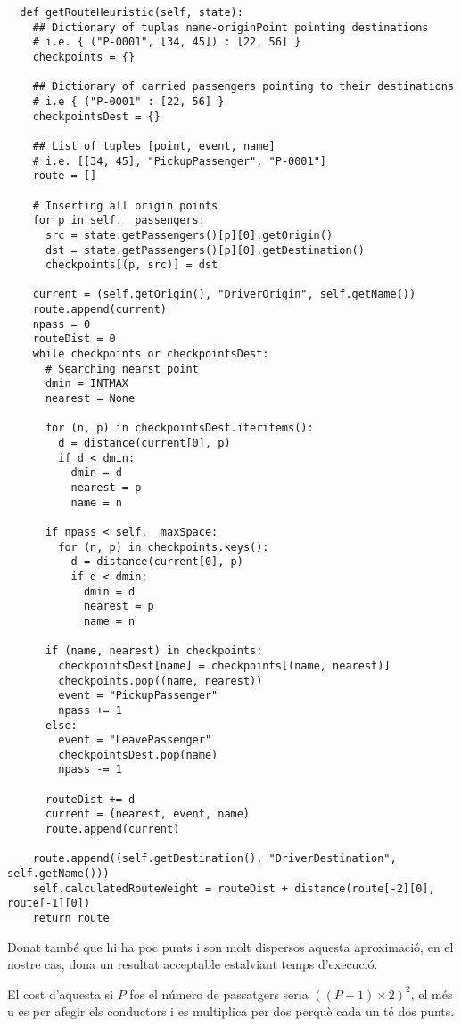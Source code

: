 \begin{verbatim}
  def getRouteHeuristic(self, state):
    ## Dictionary of tuplas name-originPoint pointing destinations
    # i.e. { ("P-0001", [34, 45]) : [22, 56] }
    checkpoints = {}

    ## Dictionary of carried passengers pointing to their destinations
    # i.e { ("P-0001" : [22, 56] }
    checkpointsDest = {}

    ## List of tuples [point, event, name]
    # i.e. [[34, 45], "PickupPassenger", "P-0001"]
    route = []

    # Inserting all origin points
    for p in self.__passengers:
      src = state.getPassengers()[p][0].getOrigin()
      dst = state.getPassengers()[p][0].getDestination()
      checkpoints[(p, src)] = dst

    current = (self.getOrigin(), "DriverOrigin", self.getName())
    route.append(current)
    npass = 0
    routeDist = 0
    while checkpoints or checkpointsDest:
      # Searching nearst point
      dmin = INTMAX
      nearest = None

      for (n, p) in checkpointsDest.iteritems():
        d = distance(current[0], p)
        if d < dmin:
          dmin = d
          nearest = p
          name = n

      if npass < self.__maxSpace:
        for (n, p) in checkpoints.keys():
          d = distance(current[0], p)
          if d < dmin:
            dmin = d
            nearest = p
            name = n

      if (name, nearest) in checkpoints:
        checkpointsDest[name] = checkpoints[(name, nearest)]
        checkpoints.pop((name, nearest))
        event = "PickupPassenger"
        npass += 1
      else:
        event = "LeavePassenger"
        checkpointsDest.pop(name)
        npass -= 1
        
      routeDist += d
      current = (nearest, event, name)
      route.append(current)
    
    route.append((self.getDestination(), "DriverDestination", self.getName()))
    self.calculatedRouteWeight = routeDist + distance(route[-2][0], route[-1][0])
    return route
\end{verbatim}

Donat també que hi ha poc punts i son molt dispersos aquesta aproximació, en el nostre cas,
dona un resultat acceptable estalviant temps d'execució.

El cost d'aquesta si $P$ fos el número de passatgers seria $((P+1) \times 2)^2$, el més u
es per afegir els conductors i es multiplica per dos perquè cada un té dos punts.

